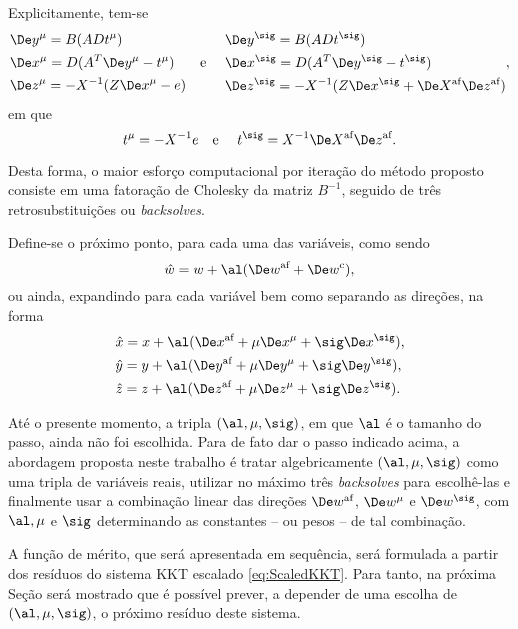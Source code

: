Explicitamente, tem-se 
\begin{equation}
\label{eq:De_C} 
\begin{aligned}
& \Dey^{\mu} = B(ADt^\mu )\\
& \Dex^{\mu} = D(A^T\Dey^{\mu} - t^\mu) \\
& \Dez^{\mu} = -X^{-1}(Z\Dex^{\mu} - e)
\end{aligned} \text{\quad e \quad } \begin{aligned}
& \Dey^{\sig} = B(ADt^\sig)\\
& \Dex^{\sig} = D(A^T\Dey^{\sig} - t^\sig) \\
& \Dez^{\sig} = -X^{-1}(Z\Dex^{\sig} + \deX\dez)
\end{aligned}, 
\end{equation}
em que
\[
t^\mu = - X^{-1}e \text{\quad e \quad} t^\sig = X^{-1}\deX\dez.
\]

Desta forma, o maior esforço computacional por iteração do método proposto consiste
em uma fatoração de Cholesky da matriz $B^{-1}$, seguido de três retrosubstituições ou \emph{backsolves}.
 
 
Define-se o próximo ponto, para cada uma das variáveis, como sendo \[\hat{w} = w
+ \al(\dew + \Decow),\] 
ou ainda, expandindo para cada variável bem como
separando as direções, na forma
\begin{subequations}
\label{eq:next-iterate}
\begin{align}
& \hat{x} = x + \al(\dex + \mu\Dex^\mu + \sig\Dex^\sig ),  \\
& \hat{y} = y + \al(\dey + \mu\Dey^\mu + \sig\Dey^\sig ), \\
& \hat{z} = z + \al(\dez + \mu\Dez^\mu + \sig\Dez^\sig ).
\end{align} 
\end{subequations}

Até o presente momento, a tripla $(\al, \mu,\sig)$, em que $\al$ é o tamanho do
passo, ainda não foi escolhida. Para de fato dar o passo indicado acima, a
abordagem proposta neste trabalho é tratar algebricamente $(\al, \mu,\sig)$ como
uma tripla de variáveis reais, utilizar no máximo três \emph{backsolves} para
escolhê-las e finalmente usar a combinação linear das direções $\dew$,
$\Dew^\mu$ e $\Dew^\sig$, com $\al,\mu$ e $\sig$ determinando
as constantes -- ou pesos --  de tal combinação.




A função de mérito, que será  apresentada em sequência, será formulada a partir
dos resíduos do sistema KKT escalado \eqref{eq:ScaledKKT}. Para tanto, na
próxima Seção será mostrado que é possível prever, a depender de
uma escolha de $(\al, \mu,\sig)$, o próximo resíduo deste sistema.


